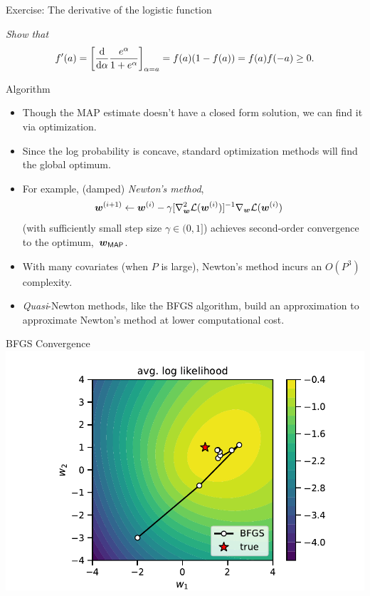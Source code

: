 \documentclass[aspectratio=169]{beamer}
\begin{document}
\begin{frame}[t]{Exercise: The derivative of the logistic function}

\textit{Show that}
\begin{align}
    f'(a) = \left[\frac{\mathop{}\!\mathrm{d}}{\mathop{}\!\mathrm{d} \alpha} \frac{e^\alpha}{1+e^\alpha}\right]_{\alpha=a} = f(a) (1 - f(a)) = f(a)f(-a) \geq 0.
\end{align}

\end{frame}


\begin{frame}{Algorithm}
\begin{itemize}

\item Though the MAP estimate doesn't have a closed form solution, we can find it via optimization. 

\item Since the log probability is concave, standard optimization methods will find the global optimum. 

\item For example, (damped) \emph{Newton's method},
\begin{align}
    \boldsymbol{w}^{(i+1)} &\leftarrow \boldsymbol{w}^{(i)} - \gamma [\nabla^2_{\boldsymbol{w}} \mathcal{L}(\boldsymbol{w}^{(i)})]^{-1} \nabla_{\boldsymbol{w}} \mathcal{L}(\boldsymbol{w}^{(i)}) 
\end{align}
(with sufficiently small step size $\gamma \in (0, 1]$) achieves second-order convergence to the optimum,~$\boldsymbol{w}_{\mathsf{MAP}}$.

\item With many covariates (when $P$ is large), Newton's method incurs an $O(P^3)$ complexity. 

\item \emph{Quasi}-Newton methods, like the BFGS algorithm, build an approximation to approximate Newton's method at lower computational cost. 

\end{itemize}

\end{frame}

\begin{frame}{BFGS Convergence}
    \centering
    \includegraphics[width=.75\textwidth]{figures/lap2/bfgs.pdf}
\end{frame}
\end{document}
